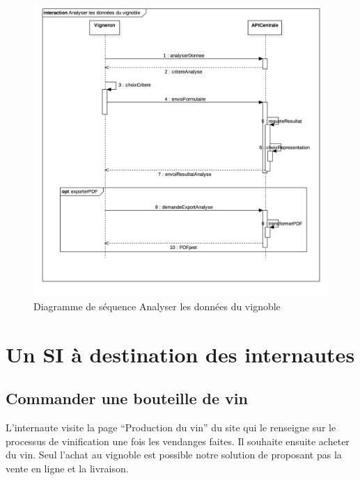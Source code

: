 \documentclass[a4paper, titlepage]{report}
\begin{document}
\clearpage
\begin{figure}[!ht]
\centering
\includegraphics{Images/SequenceDiagramAnalyserDonneesVignoble.jpg}
\caption{Diagramme de séquence Analyser les données du vignoble}
\end{figure}

\clearpage
\section{Un SI à destination des internautes}

\subsection{Commander une bouteille de vin}

L'internaute visite la page ``Production du vin'' du site qui le
renseigne sur le processus de vinification une fois les vendanges
faites. Il souhaite ensuite acheter du vin. Seul l'achat au vignoble est
possible notre solution de proposant pas la vente en ligne et la
livraison.
\end{document}
